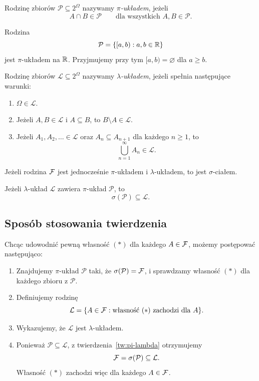 \begin{definicja}
\label{def:pi-uklad}
Rodzinę zbiorów $\mathcal P\subseteq2^\Omega$ nazywamy
\emph{$\pi$-układem}, jeżeli
\[
  A\cap B\in\mathcal P
  \qquad\text{dla wszystkich }A,B\in\mathcal P.
\]
\end{definicja}

\begin{przyklad}
Rodzina
\[
  \mathcal P=\{[a,b):a,b\in\mathbb{R}\}
\]
jest $\pi$-układem na $\mathbb{R}$. Przyjmujemy przy tym $[a,b)=\varnothing$
dla $a\geq b$.
\end{przyklad}

\begin{definicja}
\label{def:lambda-uklad}
Rodzinę zbiorów $\mathcal L\subseteq2^\Omega$ nazywamy
\emph{$\lambda$-układem}, jeżeli spełnia następujące warunki:
\begin{enumerate}
  \item $\Omega\in\mathcal L$.
  \item Jeżeli $A,B\in\mathcal L$ i $A\subseteq B$, to
    $B\setminus A\in\mathcal L$.
  \item Jeżeli $A_1,A_2,\ldots\in\mathcal L$ oraz
    $A_n\subseteq A_{n+1}$ dla każdego $n\geq1$, to
    \[
      \bigcup_{n=1}^{\infty}A_n\in\mathcal L.
    \]
\end{enumerate}
\end{definicja}

\begin{fakt}
\label{fakt:pi-lambda-sigma}
Jeżeli rodzina $\mathcal{F}$ jest jednocześnie $\pi$-układem i $\lambda$-układem,
to jest $\sigma$-ciałem.
\end{fakt}

\begin{twierdzenie}
\label{tw:pi-lambda}
Jeżeli $\lambda$-układ $\mathcal L$ zawiera $\pi$-układ $\mathcal P$,
to
\[
  \sigma(\mathcal P)\subseteq\mathcal L.
\]
\end{twierdzenie}

\subsection{Sposób stosowania twierdzenia}
\label{subsec:stosowanie-pi-lambda}

Chcąc udowodnić pewną własność $(\ast)$ dla każdego $A\in\mathcal{F}$,
możemy postępować następująco:
\begin{enumerate}
  \item Znajdujemy $\pi$-układ $\mathcal P$ taki, że
    $\sigma(\mathcal P)=\mathcal{F}$, i sprawdzamy własność $(\ast)$
    dla każdego zbioru z $\mathcal P$.
  \item Definiujemy rodzinę
    \[
      \mathcal L=\{A\in\mathcal{F}:\text{własność }(\ast)\text{ zachodzi dla }A\}.
    \]
  \item Wykazujemy, że $\mathcal L$ jest $\lambda$-układem.
  \item Ponieważ $\mathcal P\subseteq\mathcal L$, z
    twierdzenia~\ref{tw:pi-lambda} otrzymujemy
    \[
      \mathcal{F}=\sigma(\mathcal P)\subseteq\mathcal L.
    \]
    Własność $(\ast)$ zachodzi więc dla każdego $A\in\mathcal{F}$.
\end{enumerate}
